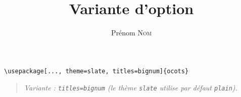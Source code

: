 \documentclass[11pt]{ocots-book}
\title{Variante d'option}
\author{Prénom \textsc{Nom}}
\newcommand{\ocotsvariantnote}[1]{\begin{quote}\itshape Variante : #1\end{quote}}
\begin{document}
\maketitle

\begin{lstlisting}
\usepackage[..., theme=slate, titles=bignum]{ocots}
\end{lstlisting}
\ocotsvariantnote{\texttt{titles=bignum} (le th\`eme \texttt{slate} utilise par d\'efaut \texttt{plain}).}

\end{document}
